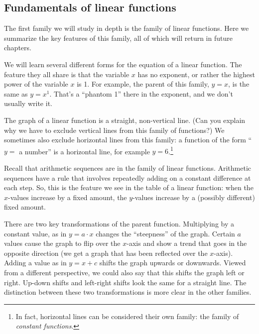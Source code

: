 \subsection{Fundamentals of linear functions}

The first family we will study in depth is the family of linear functions. Here we summarize the key features of this family, all of which will return in future chapters.

We will learn several different forms for the equation of a linear function. The feature they all share is that the variable $x$ has no exponent, or rather the highest power of the variable $x$ is 1. For example, the parent of this family, $y = x$, is the same as $y = x^1$. That's a ``phantom 1'' there in the exponent, and we don't usually write it.

The graph of a linear function is a straight, non-vertical line. (Can you explain why we have to exclude vertical lines from this family of functions?) We sometimes also exclude horizontal lines from this family: a function of the form ``$y=$ a number'' is a horizontal line, for example $y = 6$.\footnote{In fact, horizontal lines can be considered their own family: the family of \textit{constant functions}.}

Recall that arithmetic sequences are in the family of linear functions. Arithmetic sequences have a rule that involves repeatedly adding on a constant difference at each step. So, this is the feature we see in the table of a linear function: when the $x$-values increase by a fixed amount, the $y$-values increase by a (possibly different) fixed amount.

There are two key transformations of the parent function. Multiplying by a constant value, as in $y=a \cdot x$ changes the ``steepness'' of the graph. Certain $a$ values cause the graph to flip over the $x$-axis and show a trend that goes in the opposite direction (we get a graph that has been reflected over the $x$-axis). Adding a value as in $y=x + c$ shifts the graph upwards or downwards. Viewed from a different perspective, we could also say that this shifts the graph left or right. Up-down shifts and left-right shifts look the same for a straight line. The distinction between these two transformations is more clear in the other families.

